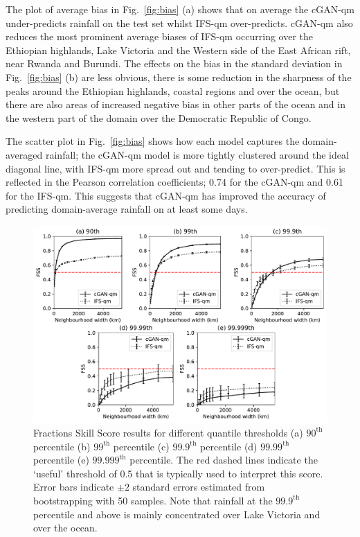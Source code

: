 \documentclass{article}
\begin{document}
The plot of average bias in Fig.~\ref{fig:bias} (a) shows that on average the cGAN-qm under-predicts rainfall on the test set whilst IFS-qm over-predicts. cGAN-qm also reduces the most prominent average biases of IFS-qm occurring over the Ethiopian highlands, Lake Victoria and the Western side of the East African rift, near Rwanda and Burundi. The effects on the bias in the standard deviation in Fig.~\ref{fig:bias} (b) are less obvious, there is some reduction in the sharpness of the peaks around the Ethiopian highlands, coastal regions and over the ocean, but there are also areas of increased negative bias in other parts of the ocean and in the western part of the domain over the Democratic Republic of Congo. 

The scatter plot in Fig.~\ref{fig:bias} shows how each model captures the domain-averaged rainfall; the cGAN-qm model is more tightly clustered around the ideal diagonal line, with IFS-qm more spread out and tending to over-predict. This is reflected in the Pearson correlation coefficients; 0.74 for the cGAN-qm and 0.61 for the IFS-qm. This suggests that cGAN-qm has improved the accuracy of predicting domain-average rainfall on at least some days.



\begin{figure}[t]
    \centering\includegraphics[width=\textwidth]{images/fss_final-nologs_217600.pdf}
     \caption{Fractions Skill Score results for different quantile thresholds (a) $90^{\text{th}}$ percentile (b) $99^{\text{th}}$ percentile (c) $99.9^{\text{th}}$ percentile (d) $99.99^{\text{th}}$ percentile (e) $99.999^{\text{th}}$ percentile. The red dashed lines indicate the `useful' threshold of 0.5 that is typically used to interpret this score. Error bars indicate $\pm2$ standard errors estimated from bootstrapping with 50 samples. Note that rainfall at the $99.9^{\text{th}}$ percentile and above is mainly concentrated over Lake Victoria and over the ocean. }
     \label{fig:fss}
\end{figure}
\end{document}
